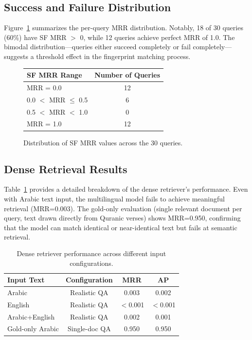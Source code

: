 \documentclass[conference]{IEEEtran}
\begin{document}
\subsection{Success and Failure Distribution}

Figure~\ref{fig:distribution} summarizes the per-query MRR distribution.
Notably, 18 of 30 queries (60\%) have SF MRR $>$ 0, while 12 queries
achieve perfect MRR of 1.0. The bimodal distribution---queries either
succeed completely or fail completely---suggests a threshold effect in
the fingerprint matching process.

\begin{figure}[h]
  \centering
  \footnotesize
  \begin{tabular}{lc}
    \toprule
    \textbf{SF MRR Range} & \textbf{Number of Queries} \\
    \midrule
    MRR = 0.0 & 12 \\
    0.0 $<$ MRR $\le$ 0.5 & 6 \\
    0.5 $<$ MRR $<$ 1.0 & 0 \\
    MRR = 1.0 & 12 \\
    \bottomrule
  \end{tabular}
  \caption{Distribution of SF MRR values across the 30 queries.}
  \label{fig:distribution}
\end{figure}

\subsection{Dense Retrieval Results}

Table~\ref{tab:dense} provides a detailed breakdown of the dense
retriever's performance. Even with Arabic text input, the multilingual
model fails to achieve meaningful retrieval (MRR=0.003). The gold-only
evaluation (single relevant document per query, text drawn directly
from Quranic verses) shows MRR=0.950, confirming that the model can
match identical or near-identical text but fails at semantic retrieval.

\begin{table}[t]
  \centering
  \caption{Dense retriever performance across different input configurations.}
  \label{tab:dense}
  \footnotesize
  \begin{tabular}{lccc}
    \toprule
    \textbf{Input Text} & \textbf{Configuration} & \textbf{MRR} &
    \textbf{AP} \\
    \midrule
    Arabic & Realistic QA & 0.003 & 0.002 \\
    English & Realistic QA & $<$0.001 & $<$0.001 \\
    Arabic+English & Realistic QA & 0.002 & 0.001 \\
    Gold-only Arabic & Single-doc QA & 0.950 & 0.950 \\
    \bottomrule
  \end{tabular}
\end{table}
\end{document}
